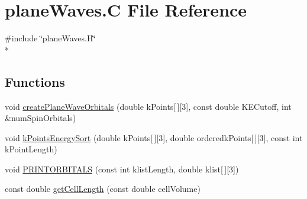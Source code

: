 \hypertarget{planeWaves_8C}{\section{plane\-Waves.\-C File Reference}
\label{planeWaves_8C}
}
{\ttfamily \#include \char`\"{}plane\-Waves.\-H\char`\"{}}\\*
\subsection*{Functions}
\begin{DoxyCompactItemize}
\item 
void \hyperlink{planeWaves_8C_a7f031a58558d27a9ac10ccaa91c0b687}{create\-Plane\-Wave\-Orbitals} (double k\-Points\mbox{[}$\,$\mbox{]}\mbox{[}3\mbox{]}, const double K\-E\-Cutoff, int \&num\-Spin\-Orbitals)
\item 
void \hyperlink{planeWaves_8C_af1dd979f3da378994fc120e81ca54de6}{k\-Points\-Energy\-Sort} (double k\-Points\mbox{[}$\,$\mbox{]}\mbox{[}3\mbox{]}, double orderedk\-Points\mbox{[}$\,$\mbox{]}\mbox{[}3\mbox{]}, const int k\-Point\-Length)
\item 
void \hyperlink{planeWaves_8C_a57a7c35693ab0bf2b167da0e2660c0ca}{P\-R\-I\-N\-T\-O\-R\-B\-I\-T\-A\-L\-S} (const int klist\-Length, double klist\mbox{[}$\,$\mbox{]}\mbox{[}3\mbox{]})
\item 
const double \hyperlink{planeWaves_8C_ac6dd2d721900579d23395c49cd3a6ed5}{get\-Cell\-Length} (const double cell\-Volume)
\end{DoxyCompactItemize}


